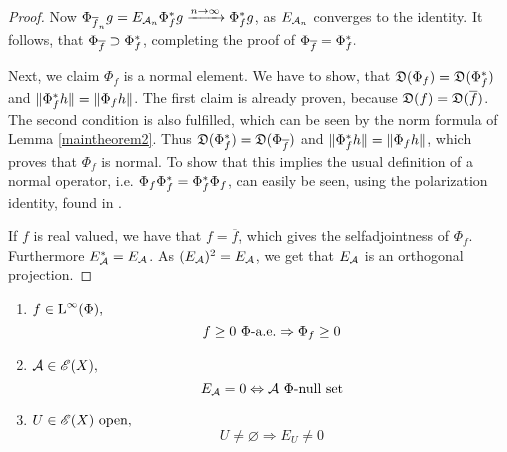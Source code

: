 \begin{proof}
% 


Now $\Phi_{\overline{f}_n} g = E_{\mathcal{A}_n} \Phi_f ^{*} g 
\xrightarrow{n \to \infty} \Phi_f ^{*} g$, as $E_{\mathcal{A}_n}$ converges
to the identity. It follows, that $\Phi_{\overline{f}} \supset \Phi_f ^{*}$,
completing the proof of $\Phi_{\overline{f}} = \Phi_f ^{*}.$



Next, we claim $\Phi_f$ is a normal element. We have to show, that
$\mathfrak{D}(\Phi_f) = \mathfrak{D}(\Phi_f ^{*})$ and $\| \Phi_f ^{*} h \| = \| \Phi_f h \|$.
The first claim is already proven, because 
$\mathfrak{D}(f) = \mathfrak{D}(\overline{f})$. The second condition is also fulfilled,
which can be seen by the norm formula of Lemma \ref{maintheorem2}.
Thus $\mathfrak{D}(\Phi_f ^{*}) = \mathfrak{D}(\Phi_{\overline{f}})$ and 
$\| \Phi_f ^{*} h \| = \| \Phi_f h \|$, which proves that $\Phi_f$ is normal.
To show that this implies the usual definition of a normal operator,
i.e. $\Phi_f \Phi_f ^{*} = \Phi_f ^{*} \Phi_f$,
can easily be seen, using the polarization identity, found in 
\cite[Ch. 4.6]{LinOps}.

If $f$ is real valued, we have that $f = \overline{f}$, which gives 
the selfadjointness of $\Phi_f$. Furthermore $E_\mathcal{A} ^{*} = E_\mathcal{A}$. 
As $(E_\mathcal{A})^2 = E_\mathcal{A}$, we get that $E_\mathcal{A}$ is an orthogonal
projection.

\end{proof}


\begin{cor}
  \leavevmode
  \label{maintheorem3+}
 \begin{enumerate}
  \item $f \in {\text{L}^\infty }(\Phi),$ 
  \[
   f \geq 0 ~\Phi\text{-a.e.} \Rightarrow \Phi_f \geq 0
  \]

  \item $\mathcal{A} \in \mathscr{E}(X),$
  \[
  E_\mathcal{A} =0  \Leftrightarrow \mathcal{A} ~\Phi\text{-null set}
  \]
  \item $U \in \mathscr{E}(X)\text{ open,}$ 
  \[
   U \neq \varnothing \Rightarrow E_U \neq 0
  \]

 \end{enumerate}

\end{cor}



